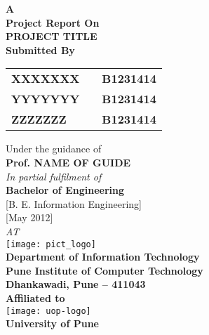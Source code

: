 
\newpage


\begin{center}
\thispagestyle{empty}


\Large{\textbf{A\\Project Report On}}\\[0.7cm]
\Large{\textsc {\textbf{PROJECT TITLE}}}\\[0.5cm]
\Large{\textbf{Submitted By}}\\[0.5cm]
\begin{table}[h]
\centering
\begin{tabular}{>{\bfseries}lc>{\bfseries}r}
XXXXXXX & & B1231414\\ %
YYYYYYY & & B1231414\\ %
ZZZZZZZ & & B1231414\\ %
\end{tabular}
\end{table}
\large{Under the guidance of}\\[0.5cm]
\Large{\textbf{Prof. NAME OF GUIDE}}\\[0.4cm]
\large{\emph{In partial fulfilment of}}\\
\LARGE{\textbf{Bachelor of Engineering}}\\
\LARGE{{[}B. E. Information Engineering{]}}\\[0.5cm]
\LARGE{{[}May 2012{]}}\\
\Large{\emph{AT}}\\[0.2cm]



\texttt{[image: pict\_logo]}\\
\large{\textbf{Department of Information Technology}}\\
\LARGE{\textbf{Pune Institute of Computer Technology}}\\
\Large{\textbf{Dhankawadi, Pune – 411043}}\\[0.5cm]
\Large{\textbf{Affiliated to}}\\[0.5cm]
\texttt{[image: uop-logo]}\\
\LARGE{\textbf{University of Pune}}
\newpage

\end{center}


\begin{flushleft}
\end{flushleft}
